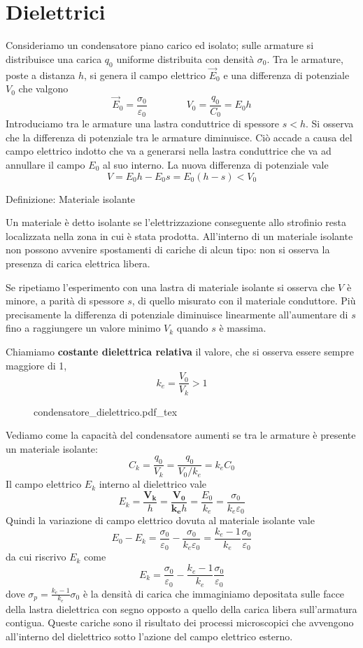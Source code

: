 \documentclass[x11names]{report}
\newcommand{\definizione}[2]{
	\begin{center}
		\fboxsep11pt
		\colorbox{myblue}{\begin{minipage}{5.75in}
				\begin{blues}{Definizione: #1}
					#2
				\end{blues}
		\end{minipage}}
	\end{center}
}
\newcommand{\incfig}[1]{%
	{#1.pdf_tex}
}
\begin{document}
\section{Dielettrici}
Consideriamo un condensatore piano carico ed isolato; sulle armature si distribuisce una carica \(q_0\) uniforme distribuita con densità \(\sigma_0\). Tra le armature, poste a distanza \(h\), si genera il campo elettrico \(\vec{E}_0\) e una differenza di potenziale \(V_0\) che valgono
\[
\vec{E}_0 = \frac{\sigma_0}{\varepsilon_0} \qquad\qquad V_0 = \frac{q_0}{C_0} = E_0 h
\]
Introduciamo tra le armature una lastra conduttrice di spessore \(s < h\). Si osserva che la differenza di potenziale tra le armature diminuisce. Ciò accade a causa del campo elettrico indotto che va a generarsi nella lastra conduttrice che va ad annullare il campo \(E_0\) al suo interno. La nuova differenza di potenziale vale
\[
V = E_0h - E_0 s = E_0(h-s) < V_0
\]
\definizione{Materiale isolante}{
Un materiale è detto isolante se l'elettrizzazione conseguente allo strofinio resta localizzata nella zona in cui è stata prodotta. All'interno di un materiale isolante non possono avvenire spostamenti di cariche di alcun tipo: non si osserva la presenza di carica elettrica libera.
}
Se ripetiamo l'esperimento con una lastra di materiale isolante si osserva che \(V\) è minore, a parità di spessore \(s\), di quello misurato con il materiale conduttore. Più precisamente la differenza di potenziale diminuisce linearmente all'aumentare di \(s\) fino a raggiungere un valore minimo \(V_k\) quando \(s\) è massima.

Chiamiamo \textbf{costante dielettrica relativa} il valore, che si osserva essere sempre maggiore di 1,
\[
k_e = \frac{V_0}{V_k} > 1
\] 
\begin{figure}[H]
	\centering
	\incfig{condensatore_dielettrico}
\end{figure}
Vediamo come la capacità del condensatore aumenti se tra le armature è presente un materiale isolante:
\[
C_k = \frac{q_0}{V_k} = \frac{q_0}{V_0/k_e} = k_eC_0
\]
Il campo elettrico \(E_k\) interno al dielettrico vale
\[
E_k = \frac{\boldsymbol{V_k}}{h} = \frac{\boldsymbol{V_0}}{\boldsymbol{k_e}h} = \frac{E_0}{k_e} = \frac{\sigma_0}{k_e\varepsilon_0}
\]
Quindi la variazione di campo elettrico dovuta al materiale isolante vale
\[
E_0 - E_{k} = \frac{\sigma_0}{\varepsilon_0} -  \frac{\sigma_0}{k_e\varepsilon_0} = \frac{k_e - 1}{k_e}\frac{\sigma_0}{\varepsilon_0}
\]
da cui riscrivo \(E_k\) come 
\[
E_k = \frac{\sigma_0}{\varepsilon_0} - \frac{k_e - 1}{k_e}\frac{\sigma_0}{\varepsilon_0}
\]
dove \(\sigma_p =  \frac{k_e - 1}{k_e}\sigma_0\) è la densità di carica che immaginiamo depositata sulle facce della lastra dielettrica con segno opposto a quello della carica libera sull'armatura contigua. Queste cariche sono il risultato dei processi microscopici che avvengono all'interno del dielettrico sotto l'azione del campo elettrico esterno. 
\end{document}
